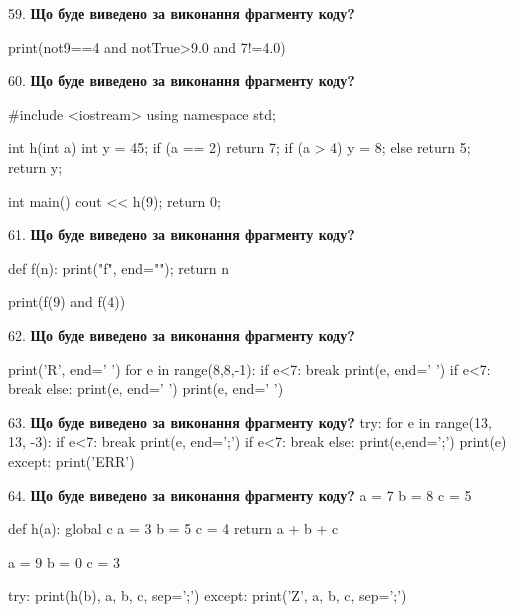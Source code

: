 \documentclass[11pt]{article}
\begin{document}
59. \textbf{Що буде виведено за виконання фрагменту коду?}

print(not9==4 and notTrue>9.0 and 7!=4.0)
\par\vspace{5mm}

60. \textbf{Що буде виведено за виконання фрагменту коду?}

#include <iostream>
using namespace std;

int h(int a){
    int y = 45;
    if (a == 2) 
        return 7;
    if (a > 4)
         y = 8;
    else
         return 5;
    return y;
}

int main(){
    cout << h(9);
    return 0;
}

\par\vspace{5mm}

61. \textbf{Що буде виведено за виконання фрагменту коду?}

def f(n):
    print("f", end="");
    return n

print(f(9) and f(4))
\par\vspace{5mm}

62. \textbf{Що буде виведено за виконання фрагменту коду?}

print('R', end=' ')
for e in range(8,8,-1):
    if e<7:
        break
        print(e, end=' ')
    if e<7:
        break
    else:
        print(e, end=' ')
    print(e, end=' ')
\par\vspace{5mm}

63. \textbf{Що буде виведено за виконання фрагменту коду?}
try:
    for e in range(13, 13, -3):
        if e<7:
            break
        print(e, end=';')
        if e<7:
            break
    else:
        print(e,end=';')
    print(e)
except:
    print('ERR')
\par\vspace{5mm}

64. \textbf{Що буде виведено за виконання фрагменту коду?}
a = 7
b = 8
c = 5

def h(a):
global c    a = 3
    b = 5
    c = 4
    return a + b + c

a = 9
b = 0
c = 3

try:
    print(h(b), a, b, c, sep=';')
except:
    print('Z', a, b, c, sep=';')
\par\vspace{5mm}
\end{document}
